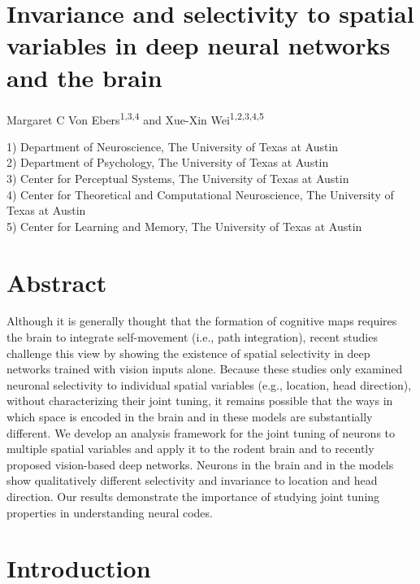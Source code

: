 \documentclass[11pt]{article}
\begin{document}
\section*{\LARGE  Invariance and selectivity to spatial variables in deep neural networks and the brain }

Margaret C Von Ebers\textsuperscript{1,3,4} and Xue-Xin Wei\textsuperscript{1,2,3,4,5}

1) Department of Neuroscience, The University of Texas at Austin\\
2) Department of Psychology, The University of Texas at Austin\\
3) Center for Perceptual Systems, The University of Texas at Austin\\
4) Center for Theoretical and Computational Neuroscience, The University of Texas at Austin\\
5) Center for Learning and Memory, The University of Texas at Austin

\section*{Abstract}
Although it is generally thought that the formation of cognitive maps requires the brain to integrate self-movement (i.e., path integration), recent studies challenge this view by showing the existence of spatial selectivity in deep networks trained with vision inputs alone.
Because these studies only examined neuronal selectivity to individual spatial variables (e.g., location, head direction), without characterizing their joint tuning,
it remains possible that the ways in which space is encoded in the brain and in these models are substantially different.
We develop an analysis framework for the joint tuning of neurons to multiple spatial variables and apply it to the rodent brain and to recently proposed vision-based deep networks. Neurons in the brain and in the models show qualitatively different selectivity and invariance to location and head direction. Our results demonstrate the importance of studying joint tuning properties in understanding neural codes.

\newpage
\section{Introduction}
\end{document}
